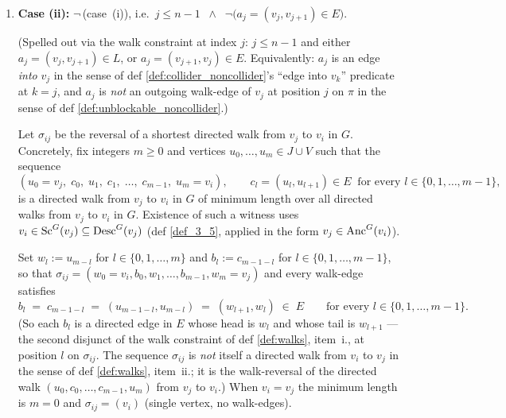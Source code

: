 \begin{Lem}[LabelRoman]
\begin{enumerate}[label=(\roman*)]
            Let $\sigma_{ij}$ be a shortest directed walk from $v_i$ to $v_j$ in $G$:
            \[
                (w_0 = v_i, \; b_0, \; w_1, \; b_1, \; \dots, \; b_{m-1}, \; w_m = v_j),
                \qquad
                b_l = (w_l, w_{l+1}) \in E \;\;\text{for every } l \in \{0, 1, \dots, m - 1\},
            \]
            of minimum length over all directed walks from $v_i$ to $v_j$ in $G$. Existence of such a witness uses $v_i \in \Sc^G(v_j) \subseteq \Anc^G(v_j)$ (def \ref{def_3_5}). When $v_i = v_j$ the minimum length is $m = 0$ and $\sigma_{ij} = (v_i)$ (single vertex, no walk-edges).

        \item \textbf{Case (ii):} $\lnot\,$(case~(i)), i.e.\ $j \le n - 1 \;\;\land\;\; \lnot\bigl(a_j = (v_j, v_{j+1}) \in E\bigr)$.

            (Spelled out via the walk constraint at index $j$: $j \le n - 1$ and either $a_j = (v_j, v_{j+1}) \in L$, or $a_j = (v_{j+1}, v_j) \in E$. Equivalently: $a_j$ is an edge \emph{into} $v_j$ in the sense of def \ref{def:collider_noncollider}'s ``edge into $v_k$'' predicate at $k = j$, and $a_j$ is \emph{not} an outgoing walk-edge of $v_j$ at position $j$ on $\pi$ in the sense of def \ref{def:unblockable_noncollider}.)

            Let $\sigma_{ij}$ be the reversal of a shortest directed walk from $v_j$ to $v_i$ in $G$. Concretely, fix integers $m \ge 0$ and vertices $u_0, \dots, u_m \in J \cup V$ such that the sequence
            \[
                (u_0 = v_j, \; c_0, \; u_1, \; c_1, \; \dots, \; c_{m-1}, \; u_m = v_i),
                \qquad
                c_l = (u_l, u_{l+1}) \in E \;\;\text{for every } l \in \{0, 1, \dots, m - 1\},
            \]
            is a directed walk from $v_j$ to $v_i$ in $G$ of minimum length over all directed walks from $v_j$ to $v_i$ in $G$. Existence of such a witness uses $v_i \in \mathrm{Sc}^G(v_j) \subseteq \mathrm{Desc}^G(v_j)$ (def \ref{def_3_5}, applied in the form $v_j \in \mathrm{Anc}^G(v_i)$).

            Set $w_l := u_{m - l}$ for $l \in \{0, 1, \dots, m\}$ and $b_l := c_{m - 1 - l}$ for $l \in \{0, 1, \dots, m - 1\}$, so that $\sigma_{ij} = (w_0 = v_i, b_0, w_1, \dots, b_{m-1}, w_m = v_j)$ and every walk-edge satisfies
            \[
                b_l \;=\; c_{m - 1 - l} \;=\; (u_{m - 1 - l}, u_{m - l}) \;=\; (w_{l+1}, w_l) \;\in\; E
                \qquad\text{for every } l \in \{0, 1, \dots, m - 1\}.
            \]
            (So each $b_l$ is a directed edge in $E$ whose head is $w_l$ and whose tail is $w_{l+1}$ — the second disjunct of the walk constraint of def \ref{def:walks}, item~i., at position $l$ on $\sigma_{ij}$. The sequence $\sigma_{ij}$ is \emph{not} itself a directed walk from $v_i$ to $v_j$ in the sense of def \ref{def:walks}, item~ii.; it is the walk-reversal of the directed walk $(u_0, c_0, \dots, c_{m-1}, u_m)$ from $v_j$ to $v_i$.) When $v_i = v_j$ the minimum length is $m = 0$ and $\sigma_{ij} = (v_i)$ (single vertex, no walk-edges).
    \end{enumerate}


\end{Lem}

